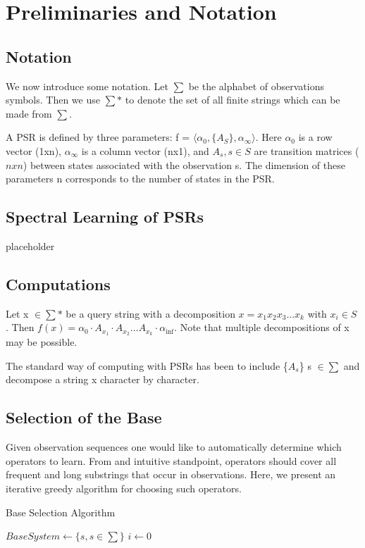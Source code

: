 \documentclass{acm_proc_article-sp}
\begin{document}
\section{Preliminaries and Notation}

\subsection{Notation}
We now introduce some notation. Let $\sum$ be the alphabet of observations symbols. Then we use $\sum*$ to denote the set of all finite strings which can be made from $\sum$.

A PSR is defined by three parameters: f = $\langle\alpha_0, \{A_S\},\alpha_{\infty}\rangle$. Here $\alpha_0$ is a row vector (1xn), $\alpha_{\infty}$ is a column vector (nx1), and $A_s, s \in S$ are transition matrices ($nxn$) between states associated with the observation s. The dimension of these parameters n corresponds to the number of states in the PSR. 

\subsection{Spectral Learning of PSRs}
placeholder

\subsection{Computations}
Let x $\in \sum*$ be a query string with a decomposition $x=x_1x_2x_3...x_k$ with $x_i \in S$ . Then  $f(x) = \alpha_0 \cdot A_{x_1} \cdot A_{x_2} ... A_{x_k} \cdot \alpha_{\inf}$. Note that multiple decompositions of x may be possible. 

The standard way of computing with PSRs has been to include \{$A_s$\} s $\in \sum$ and decompose a string x character by character.

\subsection{Selection of the Base}

Given observation sequences one would like to automatically determine which operators to learn. From and intuitive standpoint, operators should cover all frequent and long substrings that occur in observations. Here, we present an iterative greedy algorithm for choosing such operators.

\begin{algorithm}
\caption{Base Selection Algorithm}
\label{Base Selection}
\begin{algorithmic}[1]
\State $BaseSystem \gets \{s, s \in \sum \} $
\State $i\gets 0$

\EndFor
\EndProcedure
\end{algorithmic}
\end{algorithm}
\end{document}

